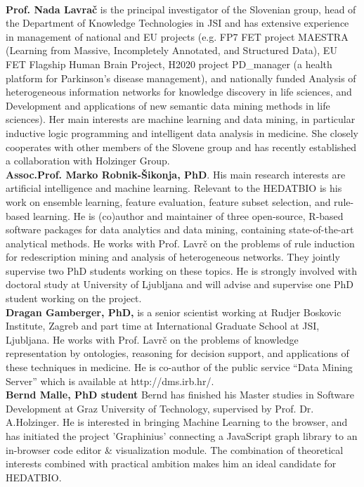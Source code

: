 \documentclass[a4paper,11pt]{article}
\begin{document}
%
\\[0,2cm]
\textbf{Prof. Nada Lavra\v{c}} is the principal investigator of the Slovenian group, head of the Department of Knowledge Technologies in JSI and has extensive experience in management of national and EU projects (e.g. FP7 FET project MAESTRA (Learning from Massive, Incompletely Annotated, and Structured Data), EU FET Flagship Human Brain Project, H2020 project PD\_manager (a health platform for Parkinson's disease management), and nationally funded  Analysis of heterogeneous information networks for knowledge discovery in life sciences, and Development and applications of new semantic data mining methods in life sciences). Her main interests are machine learning and data mining, in particular inductive logic programming and intelligent data analysis in medicine. She closely cooperates with other members of the Slovene group and has recently established a collaboration with Holzinger Group. 
\\[0,2cm]
\textbf{Assoc.Prof. Marko Robnik-\v{S}ikonja, PhD}. His main research interests are artificial intelligence and machine learning. Relevant to the HEDATBIO is his work on ensemble learning,  feature evaluation, feature subset  selection, and  rule-based learning. He is (co)author and maintainer of three open-source,  R-based  software packages  for  data  analytics  and  data  mining, containing state-of-the-art analytical methods. He works with Prof. Lavr\v{c} on the problems of rule induction for redescription mining and analysis of heterogeneous networks. They jointly supervise two PhD students working on these topics. He is strongly involved with doctoral study at University of Ljubljana and will advise and supervise one PhD student working on the project.
\\[0,2cm]
\textbf{Dragan Gamberger, PhD,} is a senior scientist working at Rudjer Boskovic Institute, Zagreb and part time at International Graduate School at JSI, Ljubljana.  He works with Prof. Lavr\v{c} on the problems of knowledge representation by ontologies, reasoning for decision support, and applications of these techniques in medicine. He is co-author of the public service “Data Mining Server” which is available at http://dms.irb.hr/.
\\[0,2cm]
\textbf{Bernd Malle, PhD student} 
Bernd has finished his Master studies in Software Development at Graz University of Technology, supervised by Prof. Dr. A.Holzinger. He is interested in bringing Machine Learning to the browser, and has initiated the project 'Graphinius' connecting a JavaScript graph library to an in-browser code editor \& visualization module. The combination of theoretical interests combined with practical ambition makes him an ideal candidate for HEDATBIO. 
\end{document}
